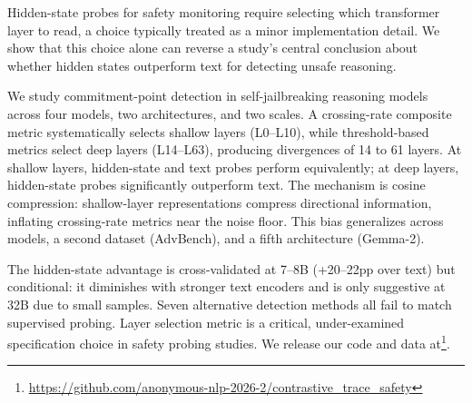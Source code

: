 Hidden-state probes for safety monitoring require selecting which transformer layer to read, a choice typically treated as a minor implementation detail. We show that this choice alone can reverse a study's central conclusion about whether hidden states outperform text for detecting unsafe reasoning.

We study commitment-point detection in self-jailbreaking reasoning models across four models, two architectures, and two scales. A crossing-rate composite metric systematically selects shallow layers (L0--L10), while threshold-based metrics select deep layers (L14--L63), producing divergences of 14 to 61 layers. At shallow layers, hidden-state and text probes perform equivalently; at deep layers, hidden-state probes significantly outperform text. The mechanism is cosine compression: shallow-layer representations compress directional information, inflating crossing-rate metrics near the noise floor. This bias generalizes across models, a second dataset (AdvBench), and a fifth architecture (Gemma-2).

The hidden-state advantage is cross-validated at 7--8B (+20--22pp over text) but conditional: it diminishes with stronger text encoders and is only suggestive at 32B due to small samples. Seven alternative detection methods all fail to match supervised probing. Layer selection metric is a critical, under-examined specification choice in safety probing studies. We release our code and data at\footnote{\url{https://github.com/anonymous-nlp-2026-2/contrastive_trace_safety}}.
